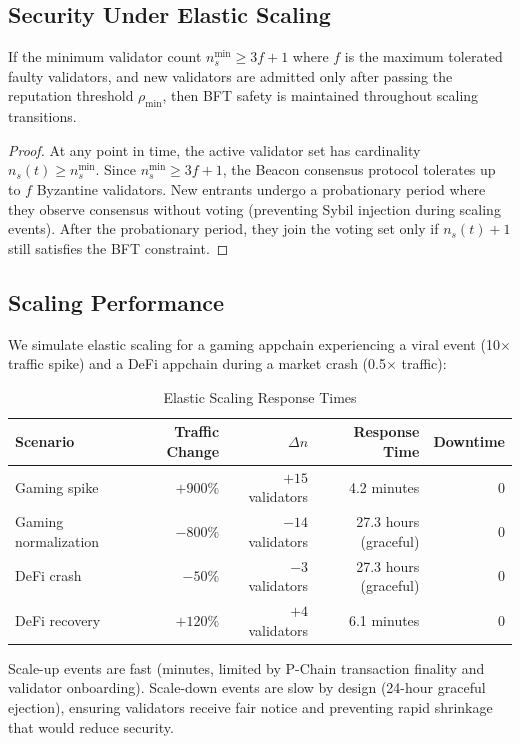 \subsection{Security Under Elastic Scaling}

\begin{theorem}
If the minimum validator count $n_s^{\min} \geq 3f+1$ where $f$ is the maximum tolerated
faulty validators, and new validators are admitted only after passing the reputation
threshold $\rho_{\min}$, then BFT safety is maintained throughout scaling transitions.
\end{theorem}

\begin{proof}
At any point in time, the active validator set has cardinality $n_s(t) \geq n_s^{\min}$.
Since $n_s^{\min} \geq 3f+1$, the Beacon consensus protocol tolerates up to $f$
Byzantine validators. New entrants undergo a probationary period where they observe
consensus without voting (preventing Sybil injection during scaling events). After the
probationary period, they join the voting set only if $n_s(t) + 1$ still satisfies the
BFT constraint.
\end{proof}

\subsection{Scaling Performance}

We simulate elastic scaling for a gaming appchain experiencing a viral event (10$\times$
traffic spike) and a DeFi appchain during a market crash (0.5$\times$ traffic):

\begin{table}[H]
\centering
\caption{Elastic Scaling Response Times}
\label{tab:elastic_perf}
\begin{tabular}{lrrrr}
\toprule
\textbf{Scenario} & \textbf{Traffic Change} & \textbf{$\Delta n$} & \textbf{Response Time} & \textbf{Downtime} \\
\midrule
Gaming spike & $+900\%$ & $+15$ validators & 4.2 minutes & 0 \\
Gaming normalization & $-800\%$ & $-14$ validators & 27.3 hours (graceful) & 0 \\
DeFi crash & $-50\%$ & $-3$ validators & 27.3 hours (graceful) & 0 \\
DeFi recovery & $+120\%$ & $+4$ validators & 6.1 minutes & 0 \\
\bottomrule
\end{tabular}
\end{table}

Scale-up events are fast (minutes, limited by P-Chain transaction finality and validator
onboarding). Scale-down events are slow by design (24-hour graceful ejection), ensuring
validators receive fair notice and preventing rapid shrinkage that would reduce security.

